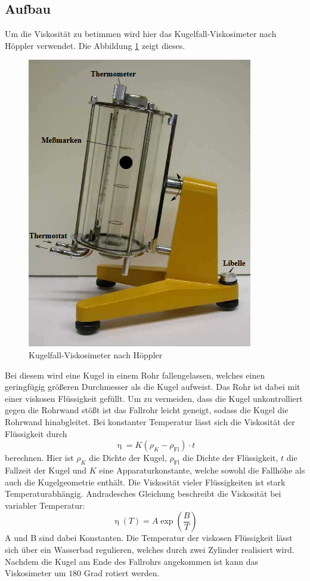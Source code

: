 \subsection{Aufbau}
Um die Viskosität zu betimmen wird hier das Kugelfall-Viskosimeter nach Höppler verwendet.
Die Abbildung \ref{fig:aufbau} zeigt dieses.
\begin{figure}
  \centering
  \includegraphics{content/Aufbau.png}
  \caption{Kugelfall-Viskosimeter nach Höppler\cite{v107}}
  \label{fig:aufbau}
\end{figure}
Bei diesem wird eine Kugel in einem Rohr fallengelassen, welches einen geringfügig größeren Durchmesser als die Kugel aufweist.
Das Rohr ist dabei mit einer viskosen Flüssigkeit gefüllt.
Um zu vermeiden, dass die Kugel unkontrolliert gegen die Rohrwand stößt ist das Fallrohr leicht geneigt, sodass die Kugel die Rohrwand hinabgleitet.
Bei konstanter Temperatur lässt sich die Viskosität der Flüssigkeit durch
\begin{equation}
  \upeta = K (\rho_K -\rho_\text{Fl}) \cdot t
\end{equation}
 berechnen.
Hier ist $\rho_K$ die Dichte der Kugel, $\rho_\text{Fl}$ die Dichte der Flüssigkeit, $t$ die Fallzeit der Kugel und $K$ eine Apparaturkonstante, welche sowohl die Fallhöhe als auch die Kugelgeometrie enthält.
Die Viskosität vieler Flüssigkeiten ist stark Temperaturabhängig.
Andradesches Gleichung beschreibt die Viskosität bei variabler Temperatur:
\begin{equation}
  \label{eq:and}
  \upeta (T)= A \exp(\frac{B}{T})
\end{equation}
A und B sind dabei Konstanten.
Die Temperatur der viskosen Flüssigkeit lässt sich über ein Wasserbad regulieren, welches durch zwei Zylinder realisiert wird.
Nachdem die Kugel am Ende des Fallrohrs angekommen ist kann das Viskosimeter um $180$ Grad rotiert werden.
